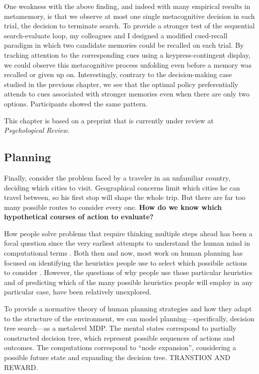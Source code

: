 \documentclass[12pt,a4paperpaper,]{article}
\begin{document}
One weakness with the above finding, and indeed with many empirical results in metamemory, is that we observe at most one single metacognitive decision in each trial, the decision to terminate search. To provide a stronger test of the sequential search-evaluate loop, my colleagues and I designed a modified cued-recall paradigm in which two candidate memories could be recalled on each trial. By tracking attention to the corresponding cues using a keypress-contingent display, we could observe this metacognitive process unfolding even before a memory was recalled or given up on. Interestingly, contrary to the decision-making case studied in the previous chapter, we see that the optimal policy preferentially attends to cues associated with stronger memories even when there are only two options. Participants showed the same pattern.

This chapter is based on a preprint that is currently under review at \emph{Psychological Review}.

\subsection{Planning}

Finally, consider the problem faced by a traveler in an unfamiliar country, deciding which cities to visit. Geographical concerns limit which cities he can travel between, so his first stop will shape the whole trip. But there are far too many possible routes to consider every one. \textbf{How do we know which hypothetical courses of action to evaluate?}

How people solve problems that require thinking multiple steps ahead has been a focal question since the very earliest attempts to understand the human mind in computational terms \citep{newell1956logic,newell1972human}. Both then and now, most work on human planning has focused on identifying the heuristics people use to select which possibile actions to consider \citep{huys2015interplay}. However, the questions of why people use those particular heuristics and of predicting which of the many possible heuristics people will employ in any particular case, have been relatively unexplored.

To provide a normative theory of human planning strategies and how they adapt to the structure of the environment, we can model planning---specifically, decision tree search---as a metalevel MDP. The mental states correspond to partially constructed decision tree, which represent possible sequences of actions and outcomes. The computations correspond to ``node expansion'', considering a possible future state and expanding the decision tree. TRANSTION AND REWARD.
\end{document}
